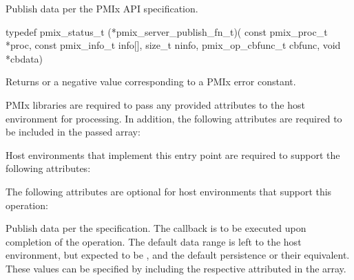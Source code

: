 \summary

Publish data per the PMIx API specification.

\format

\cspecificstart
\begin{codepar}
typedef pmix_status_t (*pmix_server_publish_fn_t)(
                             const pmix_proc_t *proc,
                             const pmix_info_t info[],
                             size_t ninfo,
                             pmix_op_cbfunc_t cbfunc,
                             void *cbdata)
\end{codepar}
\cspecificend

\begin{arglist}
\end{arglist}

Returns  or a negative value corresponding to a PMIx error constant.

\reqattrstart
\ac{PMIx} libraries are required to pass any provided attributes to the host environment for processing. In addition, the following attributes are required to be included in the passed  array:


Host environments that implement this entry point are required to support the following attributes:


\reqattrend

\optattrstart
The following attributes are optional for host environments that support this operation:


\optattrend

\descr

Publish data per the  specification.
The callback is to be executed upon completion of the operation.
The default data range is left to the host environment, but expected to be , and the default persistence  or their equivalent.
These values can be specified by including the respective attributed in the  array.

